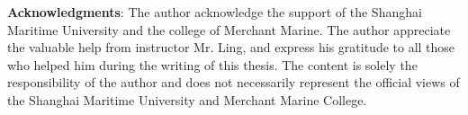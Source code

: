 \documentclass[a4paper,10.5pt]{article}
\begin{document}
\title{}
\author{ 船海 闫鹏 201430110059}
\date{}
\maketitle
\noindent
\textbf{Acknowledgments}: The author acknowledge the support of the Shanghai Maritime University and the college of Merchant Marine. The author appreciate the valuable help from instructor Mr. Ling, and express his gratitude to all those who helped him during the writing of this thesis. The content is solely the responsibility of the author and does not necessarily represent the official views of the Shanghai Maritime University and Merchant Marine College.
\end{document}
